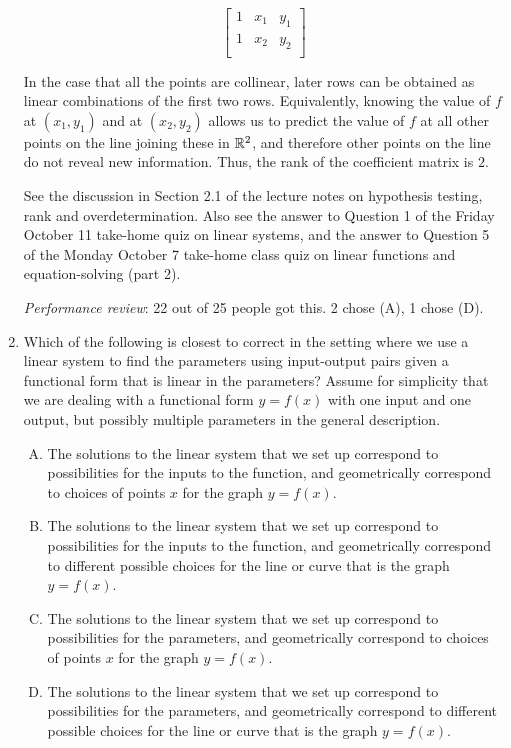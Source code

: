 \documentclass[10pt]{amsart}
\begin{document}
\begin{enumerate}
  $$\left[\begin{matrix} 1 & x_1 & y_1 \\ 1 & x_2 & y_2 \\\end{matrix}\right]$$

  In the case that all the points are collinear, later rows can be
  obtained as linear combinations of the first two rows. Equivalently,
  knowing the value of $f$ at $(x_1,y_1)$ and at $(x_2,y_2)$ allows us
  to predict the value of $f$ at all other points on the line joining
  these in $\mathbb{R}^2$, and therefore other points on the line do not
  reveal new information. Thus, the rank of the coefficient matrix is
  $2$. 

  See the discussion in Section 2.1 of the lecture notes on hypothesis
  testing, rank and overdetermination. Also see the answer to Question
  1 of the Friday October 11 take-home quiz on linear systems, and the
  answer to Question 5 of the Monday October 7 take-home class quiz on
  linear functions and equation-solving (part 2).

  {\em Performance review}: 22 out of 25 people got this. 2 chose (A),
  1 chose (D).

\item Which of the following is closest to correct in the setting
  where we use a linear system to find the parameters using
  input-output pairs given a functional form that is linear in the
  parameters? Assume for simplicity that we are dealing with a
  functional form $y = f(x)$ with one input and one output, but
  possibly multiple parameters in the general description.

  \begin{enumerate}[(A)]
  \item The solutions to the linear system that we set up correspond
    to possibilities for the inputs to the function, and geometrically
    correspond to choices of points $x$ for the graph $y = f(x)$.
  \item The solutions to the linear system that we set up correspond
    to possibilities for the inputs to the function, and geometrically
    correspond to different possible choices for the line or curve
    that is the graph $y = f(x)$.
  \item The solutions to the linear system that we set up correspond
    to possibilities for the parameters, and geometrically correspond
    to choices of points $x$ for the graph $y = f(x)$.
  \item The solutions to the linear system that we set up correspond
    to possibilities for the parameters, and geometrically correspond
    to different possible choices for the line or curve that is the
    graph $y = f(x)$.
  \end{enumerate}


\end{enumerate}
\end{document}
